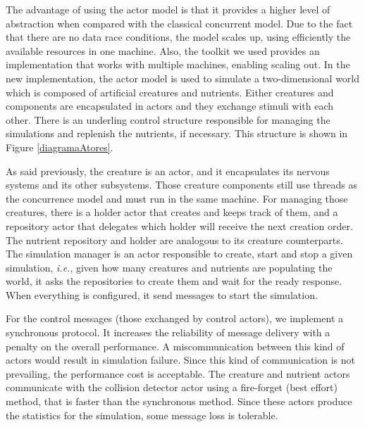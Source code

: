 \documentclass[runningheads]{llncs}
\begin{document}
The advantage of using the actor model is that it provides a higher level of abstraction when compared with the classical concurrent model. Due to the fact that there are no data race conditions, the model scales up, using efficiently the available resources in one machine. Also, the toolkit we used provides an implementation that works with multiple machines, enabling scaling out. In the new implementation, the actor model is used to simulate a two-dimensional world which is composed of artificial creatures and nutrients. Either creatures and components are encapsulated in actors and they exchange stimuli with each other. There is an underling control structure responsible for managing the simulations and replenish the nutrients, if necessary. This structure is shown in Figure \ref{diagramaAtores}. 

As said previously, the creature is an actor, and it encapsulates its nervous systems and its other subsystems. Those creature components still use threads as the concurrence model and must run in the same machine. For managing those creatures, there is a holder actor that creates and keeps track of them, and a repository actor that delegates which holder will receive the next creation order. The nutrient repository and holder are analogous to its creature counterparts. The simulation manager is an actor responsible to create, start and stop a given simulation, \textit{i.e.}, given how many creatures and nutrients are populating the world, it asks the repositories to create them and wait for the ready response. When everything is configured, it send messages to start the simulation.

For the control messages (those exchanged by control actors), we implement a synchronous protocol. It increases the reliability of message delivery with a penalty on the overall performance. A miscommunication between this kind of actors would result in simulation failure. Since this kind of communication is not prevailing, the performance cost is acceptable. The creature and nutrient actors communicate with the collision detector actor using a fire-forget (best effort) method, that is faster than the synchronous method. Since these actors produce the statistics for the simulation, some message loss is tolerable.
\end{document}
